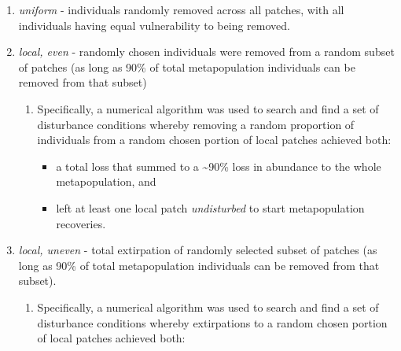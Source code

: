 \documentclass[
]{article}
\providecommand{\tightlist}{%
  \setlength{\itemsep}{0pt}\setlength{\parskip}{0pt}}
\begin{document}
\begin{enumerate}
  \begin{enumerate}
  \def\labelenumii{\alph{enumii}.}
  \tightlist
  \item
    \emph{uniform} - individuals randomly removed across all patches,
    with all individuals having equal vulnerability to being removed.
  \item
    \emph{local, even} - randomly chosen individuals were removed from a
    random subset of patches (as long as 90\% of total metapopulation
    individuals can be removed from that subset)

    \begin{enumerate}
    \def\labelenumiii{\roman{enumiii}.}
    \tightlist
    \item
      Specifically, a numerical algorithm was used to search and find a
      set of disturbance conditions whereby removing a random proportion
      of individuals from a random chosen portion of local patches
      achieved both:

      \begin{itemize}
      \tightlist
      \item
        a total loss that summed to a \textasciitilde90\% loss in
        abundance to the whole metapopulation, and
      \item
        left at least one local patch \emph{undisturbed} to start
        metapopulation recoveries.
      \end{itemize}
    \end{enumerate}
  \item
    \emph{local, uneven} - total extirpation of randomly selected subset
    of patches (as long as 90\% of total metapopulation individuals can
    be removed from that subset).

    \begin{enumerate}
    \def\labelenumiii{\roman{enumiii}.}
    \tightlist
    \item
      Specifically, a numerical algorithm was used to search and find a
      set of disturbance conditions whereby extirpations to a random
      chosen portion of local patches achieved both:


\end{enumerate}
\end{enumerate}
\end{enumerate}
\end{document}
